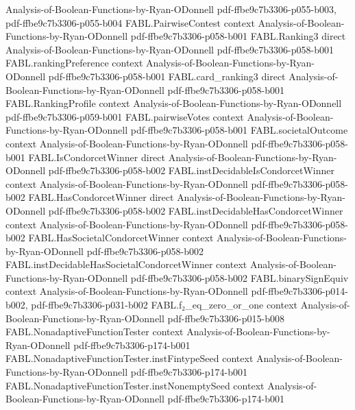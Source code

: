 \begin{theorem}
  {Analysis-of-Boolean-Functions-by-Ryan-ODonnell}
  {pdf-ffbe9c7b3306-p055-b003,
    pdf-ffbe9c7b3306-p055-b004}
\proofstep
  {FABL.PairwiseContest}
  {context}
  {Analysis-of-Boolean-Functions-by-Ryan-ODonnell}
  {pdf-ffbe9c7b3306-p058-b001}
\proofstep
  {FABL.Ranking3}
  {direct}
  {Analysis-of-Boolean-Functions-by-Ryan-ODonnell}
  {pdf-ffbe9c7b3306-p058-b001}
\proofstep
  {FABL.rankingPreference}
  {context}
  {Analysis-of-Boolean-Functions-by-Ryan-ODonnell}
  {pdf-ffbe9c7b3306-p058-b001}
\proofstep
  {FABL.card_ranking3}
  {direct}
  {Analysis-of-Boolean-Functions-by-Ryan-ODonnell}
  {pdf-ffbe9c7b3306-p058-b001}
\proofstep
  {FABL.RankingProfile}
  {context}
  {Analysis-of-Boolean-Functions-by-Ryan-ODonnell}
  {pdf-ffbe9c7b3306-p059-b001}
\proofstep
  {FABL.pairwiseVotes}
  {context}
  {Analysis-of-Boolean-Functions-by-Ryan-ODonnell}
  {pdf-ffbe9c7b3306-p058-b001}
\proofstep
  {FABL.societalOutcome}
  {context}
  {Analysis-of-Boolean-Functions-by-Ryan-ODonnell}
  {pdf-ffbe9c7b3306-p058-b001}
\proofstep
  {FABL.IsCondorcetWinner}
  {direct}
  {Analysis-of-Boolean-Functions-by-Ryan-ODonnell}
  {pdf-ffbe9c7b3306-p058-b002}
\proofstep
  {FABL.instDecidableIsCondorcetWinner}
  {context}
  {Analysis-of-Boolean-Functions-by-Ryan-ODonnell}
  {pdf-ffbe9c7b3306-p058-b002}
\proofstep
  {FABL.HasCondorcetWinner}
  {direct}
  {Analysis-of-Boolean-Functions-by-Ryan-ODonnell}
  {pdf-ffbe9c7b3306-p058-b002}
\proofstep
  {FABL.instDecidableHasCondorcetWinner}
  {context}
  {Analysis-of-Boolean-Functions-by-Ryan-ODonnell}
  {pdf-ffbe9c7b3306-p058-b002}
\proofstep
  {FABL.HasSocietalCondorcetWinner}
  {context}
  {Analysis-of-Boolean-Functions-by-Ryan-ODonnell}
  {pdf-ffbe9c7b3306-p058-b002}
\proofstep
  {FABL.instDecidableHasSocietalCondorcetWinner}
  {context}
  {Analysis-of-Boolean-Functions-by-Ryan-ODonnell}
  {pdf-ffbe9c7b3306-p058-b002}
\proofstep
  {FABL.binarySignEquiv}
  {context}
  {Analysis-of-Boolean-Functions-by-Ryan-ODonnell}
  {pdf-ffbe9c7b3306-p014-b002,
    pdf-ffbe9c7b3306-p031-b002}
\proofstep
  {FABL.f₂_eq_zero_or_one}
  {context}
  {Analysis-of-Boolean-Functions-by-Ryan-ODonnell}
  {pdf-ffbe9c7b3306-p015-b008}
\proofstep
  {FABL.NonadaptiveFunctionTester}
  {context}
  {Analysis-of-Boolean-Functions-by-Ryan-ODonnell}
  {pdf-ffbe9c7b3306-p174-b001}
\proofstep
  {FABL.NonadaptiveFunctionTester.instFintypeSeed}
  {context}
  {Analysis-of-Boolean-Functions-by-Ryan-ODonnell}
  {pdf-ffbe9c7b3306-p174-b001}
\proofstep
  {FABL.NonadaptiveFunctionTester.instNonemptySeed}
  {context}
  {Analysis-of-Boolean-Functions-by-Ryan-ODonnell}
  {pdf-ffbe9c7b3306-p174-b001}

\end{theorem}
